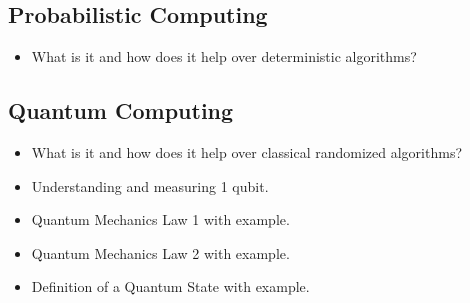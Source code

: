\subsection{Probabilistic Computing}
\begin{itemize}
    \item What is it and how does it help over deterministic algorithms?
\end{itemize}


\subsection{Quantum Computing}
\begin{itemize}
    \item What is it and how does it help over classical randomized algorithms?
    \item Understanding and measuring 1 qubit.
    \item Quantum Mechanics Law 1 with example.
    \item Quantum Mechanics Law 2 with example.
    \item Definition of a Quantum State with example.
\end{itemize}




% 
% 
% 

